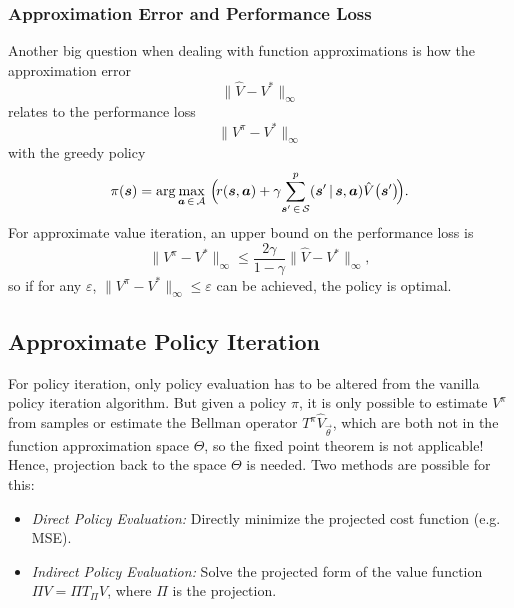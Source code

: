 			\subsubsection{Approximation Error and Performance Loss}
				Another big question when dealing with function approximations is how the approximation error
				\begin{equation*}
					\big\lVert \hat{V} - V^\ast \big\lVert_\infty
				\end{equation*}
				relates to the performance loss
				\begin{equation*}
					\big\lVert V^\pi - V^\ast \big\lVert_\infty
				\end{equation*}
				with the greedy policy
				\begin{equation*}
					\pi(\bm{s}) = \arg\max_{\bm{a} \,\in\, \mathcal{A}}\, \Big(\! r(\bm{s}, \bm{a}) + \gamma \!\sum_{\bm{s}' \,\in\, \mathcal{S}}^ p(\bm{s}' \,\vert\, \bm{s}, \bm{a}) \hat{V}\big(\bm{s}'\big) \!\Big).
				\end{equation*}
				For approximate value iteration, an upper bound on the performance loss is
				\begin{equation*}
					\big\lVert V^\pi - V^\ast \big\lVert_\infty \leq \frac{2 \gamma}{1 - \gamma} \big\lVert \hat{V} - V^\ast \big\lVert_\infty,
				\end{equation*}
				so if for any \(\varepsilon\), \( \big\lVert V^\pi - V^\ast \big\lVert_\infty \leq \varepsilon \) can be achieved, the policy is optimal.

		\subsection{Approximate Policy Iteration}
			For policy iteration, only policy evaluation has to be altered from the vanilla policy iteration algorithm. But given a policy \(\pi\), it is only possible to estimate \(V^\pi\) from samples or estimate the Bellman operator \( T^\pi \hat{V}_{\vec{\theta}} \), which are both not in the function approximation space \(\Theta\), so the fixed point theorem is not applicable! Hence, projection back to the space \(\Theta\) is needed. Two methods are possible for this:
			\begin{itemize}
				\item \emph{Direct Policy Evaluation:} Directly minimize the projected cost function (e.g. MSE).
				\item \emph{Indirect Policy Evaluation:} Solve the projected form of the value function \( \Pi V = \Pi T_\Pi V \), where \(\Pi\) is the projection.
			\end{itemize}

